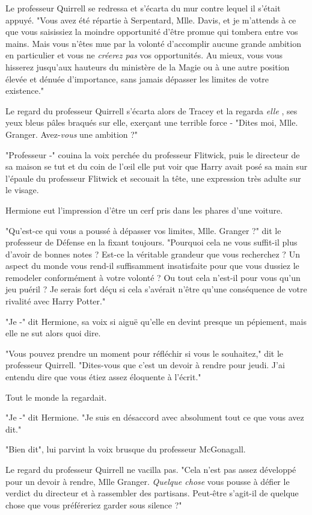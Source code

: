 Le professeur Quirrell se redressa et s'écarta du mur contre lequel il s'était appuyé. "Vous avez été répartie à Serpentard, Mlle. Davis, et je m'attends à ce que vous saisissiez la moindre opportunité d'être promue qui tombera entre vos mains. Mais vous n'êtes mue par la volonté d'accomplir aucune grande ambition en particulier et vous ne \emph{créerez pas}  vos opportunités. Au mieux, vous vous hisserez jusqu'aux hauteurs du ministère de la Magie ou à une autre position élevée et dénuée d'importance, sans jamais dépasser les limites de votre existence."

Le regard du professeur Quirrell s'écarta alors de Tracey et la regarda \emph{elle} , ses yeux bleus pâles braqués sur elle, exerçant une terrible force - "Dites moi, Mlle. Granger. Avez-\emph{vous}  une ambition ?"

"Professeur -" couina la voix perchée du professeur Flitwick, puis le directeur de sa maison se tut et du coin de l'œil elle put voir que Harry avait posé sa main sur l'épaule du professeur Flitwick et secouait la tête, une expression très adulte sur le visage.

Hermione eut l'impression d'être un cerf pris dans les phares d'une voiture.

"Qu'est-ce qui vous a poussé à dépasser vos limites, Mlle. Granger ?" dit le professeur de Défense en la fixant toujours. "Pourquoi cela ne vous suffit-il plus d'avoir de bonnes notes ? Est-ce la véritable grandeur que vous recherchez ? Un aspect du monde vous rend-il suffisamment insatisfaite pour que vous dussiez le remodeler conformément à votre volonté ? Ou tout cela n'est-il pour vous qu'un jeu puéril ? Je serais fort déçu si cela s'avérait n'être qu'une conséquence de votre rivalité avec Harry Potter."

"Je -" dit Hermione, sa voix si aiguë qu'elle en devint presque un pépiement, mais elle ne sut alors quoi dire.

"Vous pouvez prendre un moment pour réfléchir si vous le souhaitez," dit le professeur Quirrell. "Dites-vous que c'est un devoir à rendre pour jeudi. J'ai entendu dire que vous étiez assez éloquente à l'écrit."

Tout le monde la regardait.

"Je -" dit Hermione. "Je suis en désaccord avec absolument tout ce que vous avez dit."

"Bien dit", lui parvint la voix brusque du professeur McGonagall.

Le regard du professeur Quirrell ne vacilla pas. "Cela n'est pas assez développé pour un devoir à rendre, Mlle Granger. \emph{Quelque chose}  vous pousse à défier le verdict du directeur et à rassembler des partisans. Peut-être s'agit-il de quelque chose que vous préféreriez garder sous silence ?"

